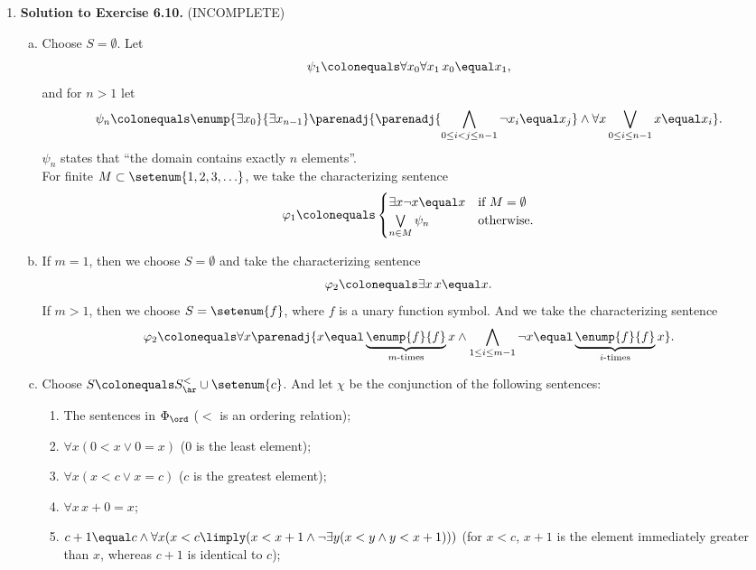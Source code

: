 \begin{enumerate}[1.]
\begin{enumerate}[(a)]
\end{enumerate}
%
\item \textbf{Solution to Exercise 6.10.} (INCOMPLETE)
\begin{enumerate}[(a)]
\item Choose $S = \emptyset$. Let
\[
\psi_1 \colonequals \forall x_0 \forall x_1 \, x_0 \equal x_1,
\]
and for $n > 1$ let
\[
\psi_n \colonequals \enump{\exists x_0}{\exists x_{n - 1}} \parenadj{\parenadj{\bigwedge\limits_{0 \leq i < j \leq n - 1} \neg x_i \equal x_j} \land \forall x \bigvee\limits_{0 \leq i \leq n - 1} x \equal x_i}.
\]
$\psi_n$ states that ``the domain contains exactly $n$ elements''.\bigskip\\
For finite $M \subset \setenum{1, 2, 3, \ldots}$, we take the characterizing sentence
\[
\varphi_1 \colonequals
\begin{cases}
\exists x \neg x \equal x & \mbox{if \(M = \emptyset\)} \cr
\bigvee\limits_{n \in M} \psi_n & \mbox{otherwise.}
\end{cases}
\]
\item If $m = 1$, then we choose $S = \emptyset$ and take the characterizing sentence
\[
\varphi_2 \colonequals \exists x \, x \equal x.
\]
If $m > 1$, then we choose $S = \setenum{f}$, where $f$ is a unary function symbol. And we take the characterizing sentence
\[
\varphi_2 \colonequals \forall x \parenadj{x \equal \underbrace{\enump{f}{f}}_{\mbox{\scriptsize\(m\)-times}} x \land \bigwedge\limits_{1 \leq i \leq m - 1} \neg x \equal \underbrace{\enump{f}{f}}_{\scriptsize\mbox{\(i\)-times}} x}.
\]
\item Choose $S \colonequals S_\ar^< \cup \setenum{c}$. And let $\chi$ be the conjunction of the following sentences:
\begin{enumerate}[(1)]
\item The sentences in $\Phi_\ord$ \quad ($<$ is an ordering relation);
\item $\forall x (0 < x \lor 0 \equal x)$ \quad ($0$ is the least element);
\item $\forall x (x < c \lor x \equal c)$ \quad ($c$ is the greatest element);
\item $\forall x \, x + 0 \equal x$;
\item $c + 1 \equal c \land \forall x (x < c \limply (x < x + 1 \land \neg\exists y (x < y \land y < x + 1)))$ \quad (for $x < c$, $x + 1$ is the element immediately greater than $x$, whereas $c + 1$ is identical to $c$);

\end{enumerate}
\end{enumerate}
\end{enumerate}
